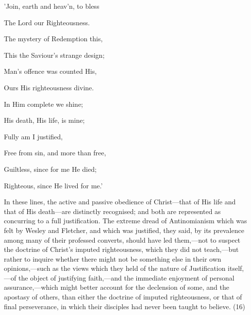 \documentclass[
]{book}
\begin{document}
'Join, earth and heav'n, to bless

The Lord our Righteousness.

The mystery of Redemption this,

This the Saviour's strange design;

Man's offence was counted His,

Ours His righteousness divine.

In Him complete we shine;

His death, His life, is mine;

Fully am I justified,

Free from sin, and more than free,

Guiltless, since for me He died;

Righteous, since He lived for me.'

In these lines, the active and passive obedience of Christ---that of His life and that of His death---are distinctly recognised; and both are represented as concurring to a full justification. The extreme dread of Antinomianism which was felt by Wesley and Fletcher, and which was justified, they said, by its prevalence among many of their professed converts, should have led them,---not to suspect the doctrine of Christ's imputed righteousness, which they did not teach,---but rather to inquire whether there might not be something else in their own opinions,---such as the views which they held of the nature of Justification itself,---of the object of justifying faith,---and the immediate enjoyment of personal assurance,---which might better account for the declension of some, and the apostasy of others, than either the doctrine of imputed righteousness, or that of final perseverance, in which their disciples had never been taught to believe. (16)
\end{document}
